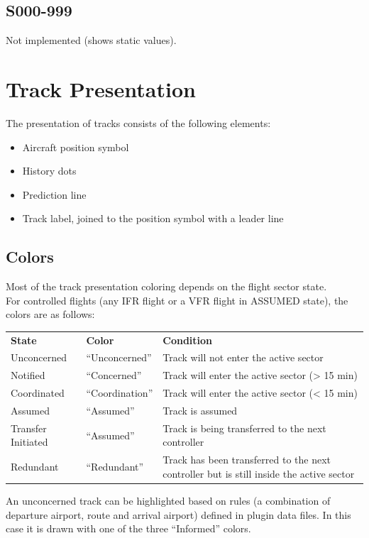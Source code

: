 \documentclass[11pt,a4paper,oldfontcommands]{memoir}
\begin{document}
\subsection{S000-999}
Not implemented (shows static values).

\section{Track Presentation}
The presentation of tracks consists of the following elements:
\begin{itemize}
    \item{Aircraft position symbol}
    \item{History dots}
    \item{Prediction line}
    \item{Track label, joined to the position symbol with a leader line}
\end{itemize}

\subsection{Colors}
Most of the track presentation coloring depends on the flight sector state.
\\For controlled flights (any IFR flight or a VFR flight in ASSUMED state), the colors are as follows:\\
\begin{tabular}{l l l}
\textbf{State}          & \textbf{Color}    & \textbf{Condition}
\\Unconcerned           & “Unconcerned”     & Track will not enter the active sector
\\Notified              & “Concerned”       & Track will enter the active sector (> 15 min)
\\Coordinated           & “Coordination”    & Track will enter the active sector (< 15 min)
\\Assumed               & “Assumed”         & Track is assumed
\\Transfer Initiated    & “Assumed”         & Track is being transferred to the next controller
\\Redundant             & “Redundant”       & Track has been transferred to the next controller but is still inside the active sector
\end{tabular}

An unconcerned track can be highlighted based on rules (a combination of departure airport, route and
arrival airport) defined in plugin data files. In this case it is drawn with one of the three “Informed” colors.\\
\end{document}
